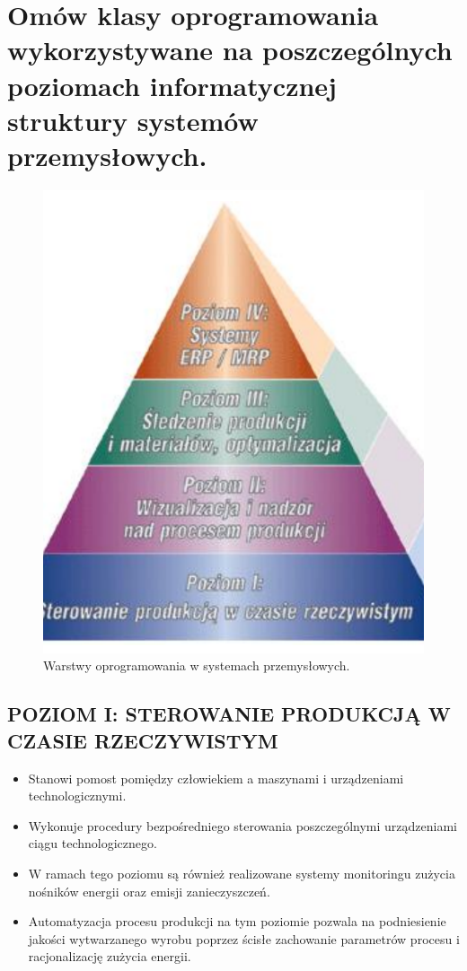 \documentclass{article}
\begin{document}
	\section{Omów klasy oprogramowania wykorzystywane na poszczególnych poziomach	informatycznej struktury systemów przemysłowych.}
	\begin{figure}[!htb]
		\centering
		\includegraphics[width=0.3\linewidth]{piramida-fabryka}
		\caption{Warstwy oprogramowania w systemach przemysłowych.}
		\label{fig:piramida-fabryka}
	\end{figure}
	
	\subsection{POZIOM I: STEROWANIE PRODUKCJĄ W CZASIE RZECZYWISTYM}
	\begin{itemize}
		\item Stanowi pomost pomiędzy człowiekiem a maszynami i urządzeniami
		technologicznymi.
		\item Wykonuje procedury bezpośredniego sterowania poszczególnymi
		urządzeniami ciągu technologicznego.
		\item W ramach tego poziomu są również realizowane systemy monitoringu zużycia
		nośników energii oraz emisji zanieczyszczeń.
		\item Automatyzacja procesu produkcji na tym poziomie pozwala na podniesienie
		jakości wytwarzanego wyrobu poprzez ścisłe zachowanie parametrów procesu
		i racjonalizację zużycia energii.	
	\end{itemize}
\end{document}
